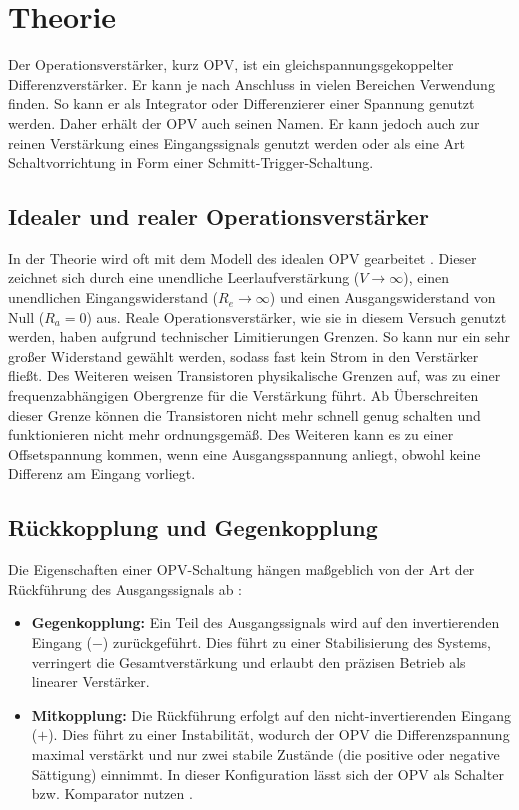 \section{Theorie}
\label{sec:Theorie}

Der Operationsverstärker, kurz OPV, ist ein gleichspannungsgekoppelter Differenzverstärker. Er kann je nach Anschluss in vielen Bereichen Verwendung finden. So kann er als Integrator oder Differenzierer einer Spannung genutzt werden. Daher erhält der OPV auch seinen Namen. Er kann jedoch auch zur reinen Verstärkung eines Eingangssignals genutzt werden oder als eine Art Schaltvorrichtung in Form einer Schmitt-Trigger-Schaltung. 

\subsection{Idealer und realer Operationsverstärker}
In der Theorie wird oft mit dem Modell des idealen OPV gearbeitet \cite{tietzeschenk}. Dieser zeichnet sich durch eine unendliche Leerlaufverstärkung ($V \to \infty$), einen unendlichen Eingangswiderstand ($R_e \to \infty$) und einen Ausgangswiderstand von Null ($R_a = 0$) aus.
Reale Operationsverstärker, wie sie in diesem Versuch genutzt werden, haben aufgrund technischer Limitierungen Grenzen. So kann nur ein sehr großer Widerstand gewählt werden, sodass fast kein Strom in den Verstärker fließt. Des Weiteren weisen Transistoren physikalische Grenzen auf, was zu einer frequenzabhängigen Obergrenze für die Verstärkung führt. Ab Überschreiten dieser Grenze können die Transistoren nicht mehr schnell genug schalten und funktionieren nicht mehr ordnungsgemäß. Des Weiteren kann es zu einer Offsetspannung kommen, wenn eine Ausgangsspannung anliegt, obwohl keine Differenz am Eingang vorliegt.

\subsection{Rückkopplung und Gegenkopplung}
Die Eigenschaften einer OPV-Schaltung hängen maßgeblich von der Art der Rückführung des Ausgangssignals ab :
\begin{itemize}
    \item \textbf{Gegenkopplung:} Ein Teil des Ausgangssignals wird auf den invertierenden Eingang ($-$) zurückgeführt. Dies führt zu einer Stabilisierung des Systems, verringert die Gesamtverstärkung und erlaubt den präzisen Betrieb als linearer Verstärker.
    \item \textbf{Mitkopplung:} Die Rückführung erfolgt auf den nicht-invertierenden Eingang ($+$). Dies führt zu einer Instabilität, wodurch der OPV die Differenzspannung maximal verstärkt und nur zwei stabile Zustände (die positive oder negative Sättigung) einnimmt. In dieser Konfiguration lässt sich der OPV als Schalter bzw. Komparator nutzen \cite[siehe auch][]{tietzeschenk}.
\end{itemize}

